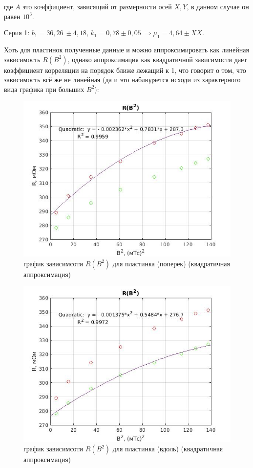 \documentclass[a4paper, 12pt]{article}%
\begin{document}
где $A$ это коэффициент, зависящий от размерности осей $X,Y$, в данном случае он равен $10^{3}$.

Серия 1: $b_1 = 36,26\ \pm 4,18$, $k_1 = 0,78 \pm 0,05\ \Rightarrow \mu_1 = 4,64 \pm XX$.



Хоть для пластинок полученные данные и можно аппроксимировать как линейная зависимость $R(B^2)$, однако аппроксимация как квадратичной зависимости дает коэффициент корреляции на порядок ближе лежащий к 1, что говорит о том, что зависимость всё же не линейная (да и это наблюдяется исходи из характерного вида графика при больших $B^2$):

\newpage

\begin{center}
\begin{figure}[!h]
    \centering
    \includegraphics[width = 10 cm]{graph2(no_disk)(quadratic_1).jpg}
    \caption{график зависимсоти $R(B^2)$ для пластинка (поперек) (квадратичная аппроксимация)}
    \label{ser2_q}
\end{figure}
\end{center}

\begin{center}
\begin{figure}[!h]
    \centering
    \includegraphics[width = 10 cm]{graph2(no_disk)(quadratic_2).jpg}
    \caption{график зависимсоти $R(B^2)$ для пластинка (вдоль) (квадратичная аппроксимация)}
    \label{ser3_q}
\end{figure}
\end{center}
\end{document}
